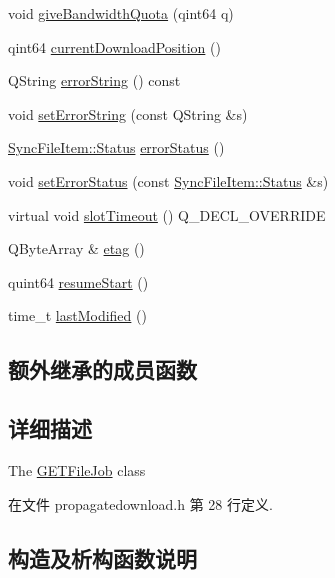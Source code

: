 \begin{DoxyCompactItemize}
\item 
void \hyperlink{class_o_c_c_1_1_g_e_t_file_job_a074cd41e4e1d4a40971cb440ed5f4c1a}{give\+Bandwidth\+Quota} (qint64 q)
\item 
qint64 \hyperlink{class_o_c_c_1_1_g_e_t_file_job_a953b2d542dc57ed4c3999bcaf6d2c7a2}{current\+Download\+Position} ()
\item 
Q\+String \hyperlink{class_o_c_c_1_1_g_e_t_file_job_a3ceb7cee2cf75c168baab212381f2026}{error\+String} () const
\item 
void \hyperlink{class_o_c_c_1_1_g_e_t_file_job_a5e87919c53eb17a7d9a3fd40b43a37cc}{set\+Error\+String} (const Q\+String \&s)
\item 
\hyperlink{class_o_c_c_1_1_sync_file_item_a149ade86eddd9661587bfbc9bcbca408}{Sync\+File\+Item\+::\+Status} \hyperlink{class_o_c_c_1_1_g_e_t_file_job_a35a26844eff92a8ac92f450b22a908c4}{error\+Status} ()
\item 
void \hyperlink{class_o_c_c_1_1_g_e_t_file_job_a9c37afdba1e10d6aaabd3f862aa0755d}{set\+Error\+Status} (const \hyperlink{class_o_c_c_1_1_sync_file_item_a149ade86eddd9661587bfbc9bcbca408}{Sync\+File\+Item\+::\+Status} \&s)
\item 
virtual void \hyperlink{class_o_c_c_1_1_g_e_t_file_job_a40e9d2ce9e97ab97a71895ee9ed0a063}{slot\+Timeout} () Q\+\_\+\+D\+E\+C\+L\+\_\+\+O\+V\+E\+R\+R\+I\+DE
\item 
Q\+Byte\+Array \& \hyperlink{class_o_c_c_1_1_g_e_t_file_job_a8c503e198129ae64dd40fa60d74dd7c3}{etag} ()
\item 
quint64 \hyperlink{class_o_c_c_1_1_g_e_t_file_job_a6b3c228a09b07ebcb6c72fb2f49c86ca}{resume\+Start} ()
\item 
time\+\_\+t \hyperlink{class_o_c_c_1_1_g_e_t_file_job_ad9f7d91356e7e3fb74c3f4fede6ffde8}{last\+Modified} ()
\end{DoxyCompactItemize}
\subsection*{额外继承的成员函数}


\subsection{详细描述}
The \hyperlink{class_o_c_c_1_1_g_e_t_file_job}{G\+E\+T\+File\+Job} class 

在文件 propagatedownload.\+h 第 28 行定义.



\subsection{构造及析构函数说明}
\mbox{\label{class_o_c_c_1_1_g_e_t_file_job_aeffc1ce2c51ba5160fef7dc37821915c}} 
